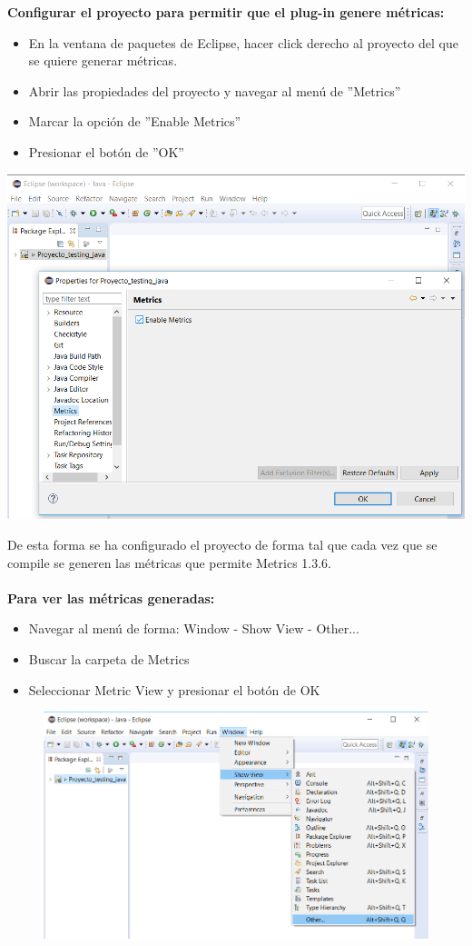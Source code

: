 \documentclass[a4paper]{article}
\newcommand\tab[1][0.55cm]{\hspace*{#1}}
\begin{document}
\justify
\textbf{Configurar el proyecto para permitir que el plug-in genere métricas:}
\begin{itemize}
  \item En la ventana de paquetes de Eclipse, hacer click derecho al proyecto del que se quiere generar métricas.
  \item Abrir las propiedades del proyecto y navegar al menú de ''Metrics''
  \item Marcar la opción de ''Enable Metrics''
  \item Presionar el botón de ''OK''
\end{itemize}
\centering
  \includegraphics[scale=0.5]{Configuracion_1}

\justify
\tab De esta forma se ha configurado el proyecto de forma tal que cada vez que se compile se generen las métricas que permite Metrics 1.3.6.\\ \\ 
\textbf{Para ver las métricas generadas:}
\begin{itemize}
  \item Navegar al menú de forma: Window - Show View - Other...
  \item Buscar la carpeta de Metrics
  \item Seleccionar Metric View y presionar el botón de OK
\end{itemize} 

\begin{figure}
  \centering
  \includegraphics[scale=0.5]{Mostrar_1}
\end{figure}
\end{document}
